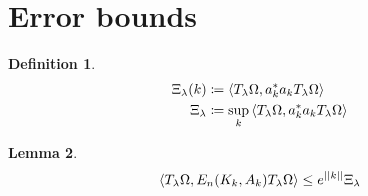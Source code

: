 \documentclass[sn-mathphys,Numbered, a4paper ,nocrop]{sn-jnl}%
\theoremstyle{plain}
\newtheorem{theorem}{Theorem}[section]
\newtheorem{lemma}[theorem]{Lemma}
\newtheorem{proposition}[theorem]{Proposition}
\theoremstyle{definition}
\newtheorem{definition}[theorem]{Definition}
\newtheorem{example}[theorem]{Example}
\theoremstyle{remark}
\newtheorem{remark}[theorem]{Remark}
\theoremstyle{plain}
\theoremstyle{definition}
\theoremstyle{remark}
\begin{document}









\section{Error bounds}
\begin{definition}
    \begin{align}
        \Xi_\lambda(k) &\coloneq \expval{T_\lambda\Omega, a^*_ka_kT_\lambda\Omega}\\
        \Xi_\lambda &\coloneq \sup\limits_{k}\expval{T_\lambda\Omega, a^*_ka_kT_\lambda\Omega}
    \end{align}
\end{definition}
\begin{lemma}
    \begin{equation}
    \expval{T_\lambda\Omega, E_n(K_k,A_k)T_\lambda\Omega}\leq e^{||k||} \Xi_\lambda  
    \end{equation}
    
\end{lemma}






\end{document}
